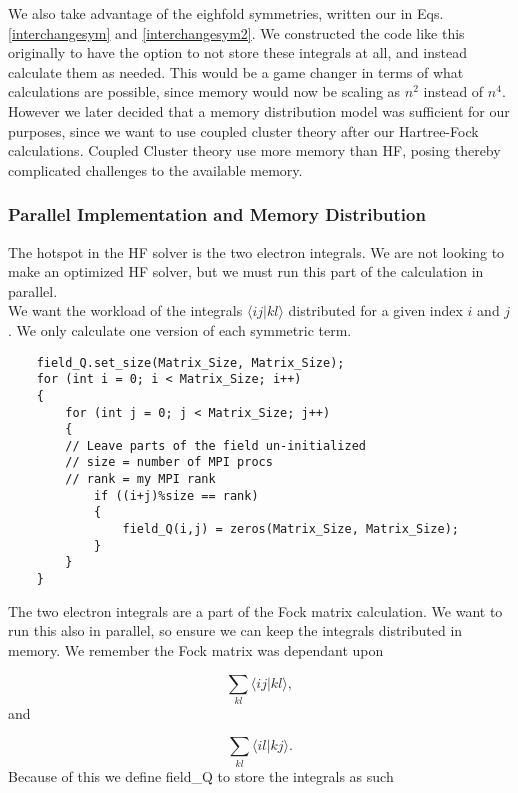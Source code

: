 \documentclass[a4paper,norsk,11pt,twoside]{report}
\begin{document}
We also take advantage of the eighfold symmetries, written our in
Eqs. \eqref{interchangesym} and \eqref{interchangesym2}. We
constructed the code like this originally to have the option to not
store these integrals at all, and instead calculate them as
needed. This would be a game changer in terms of what calculations are
possible, since memory would now be scaling as $n^2$ instead of
$n^4$. However we later decided that a memory distribution model was
sufficient for our purposes, since we want to use coupled
cluster theory after our Hartree-Fock calculations. 
Coupled Cluster theory use more memory than HF, posing thereby complicated challenges to the available memory.

\subsubsection{Parallel Implementation and Memory Distribution}
The hotspot in the HF solver is the two electron integrals. We are not looking to
make an optimized HF solver, but we must run this part of the
calculation in parallel. \\

We want the workload of the integrals $\langle i j | k l \rangle$
distributed for a given index $i$ and $j$. We only calculate one version
of each symmetric term. \\

\begin{lstlisting}
    field_Q.set_size(Matrix_Size, Matrix_Size);
    for (int i = 0; i < Matrix_Size; i++)
    {
        for (int j = 0; j < Matrix_Size; j++)
        {
        // Leave parts of the field un-initialized
        // size = number of MPI procs
        // rank = my MPI rank
            if ((i+j)%size == rank)
            {
                field_Q(i,j) = zeros(Matrix_Size, Matrix_Size);
            }
        }
    }
\end{lstlisting}

The two electron integrals are a part of the Fock matrix calculation. We want to run this also in parallel, so ensure we can keep the integrals distributed in memory. We remember the Fock matrix was dependant upon 

\begin{equation}
\sum_{kl} \langle i j | k l \rangle ,
\end{equation}
and

\begin{equation}
\sum_{kl} \langle i l | k j \rangle .
\end{equation}
Because of this we define field\_Q to store the integrals as such
\end{document}
